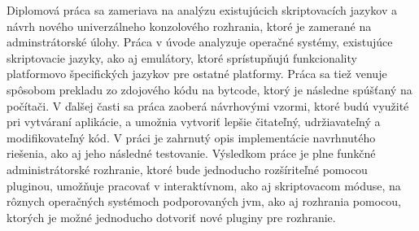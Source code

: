 Diplomová práca sa zameriava na analýzu existujúcich skriptovacích jazykov a návrh nového univerzálneho konzolového rozhrania, ktoré je  zamerané na adminstrátorské úlohy. Práca v úvode analyzuje operačné systémy, existujúce skriptovacie jazyky, ako aj emulátory, ktoré sprístupňujú funkcionality platformovo špecifických jazykov pre ostatné platformy. Práca sa  tiež venuje spôsobom prekladu zo zdojového kódu na bytcode, ktorý je následne spúšťaný na počítači. V ďalšej časti sa práca zaoberá návrhovými vzormi, ktoré budú využité pri vytváraní aplikácie, a umožnia vytvoriť lepšie čitateľný, udržiavateľný a modifikovateľný kód. V práci je zahrnutý opis implementácie navrhnutého riešenia, ako aj jeho následné testovanie. Výsledkom práce je plne funkčné administrátorské rozhranie, ktoré bude jednoducho rozšíriteľné pomocou pluginou, umožňuje pracovať v interaktívnom, ako aj skriptovacom móduse, na rôznych operačných systémoch podporovaných \acrshort{jvm}, ako aj rozhrania pomocou, ktorých je možné jednoducho dotvoriť nové pluginy pre rozhranie.

